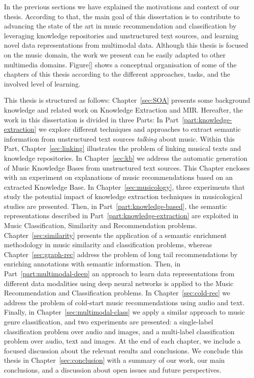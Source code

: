 In the previous sections we have explained the motivations and context of our thesis. According to that, the main goal of this dissertation is to contribute to advancing the state of the art in music recommendation and classification by leveraging knowledge repositories and unstructured text sources, and learning novel data representations from multimodal data. Although this thesis is focused on the music domain, the work we present can be easily adapted to other multimedia domains. Figure\ref{} shows a conceptual organisation of some of the chapters of this thesis according to the different approaches, tasks, and the involved level of learning.

This thesis is structured as follows: Chapter~\ref{sec:SOA} presents some background knowledge and related work on Knowledge Extraction and MIR. Hereafter, the work in this dissertation is divided in three Parts: In Part~\ref{part:knowledge-extraction} we explore different techniques and approaches to extract semantic information from unstructured text sources \textit{talking} about music. Within this Part, Chapter~\ref{sec:linking} illustrates the problem of linking musical texts and knowledge repositories. In Chapter~\ref{sec:kb} we address the automatic generation of Music Knowledge Bases from unstructured text sources. This Chapter encloses with an experiment on explanations of music recommendations based on an extracted Knowledge Base. In Chapter~\ref{sec:musicology}, three experiments that study the potential impact of knowledge extraction techniques in musicological studies are presented.
Then, in Part~\ref{part:knowledge-based}, the semantic representations described in Part~\ref{part:knowledge-extraction} are exploited in Music Classification, Similarity and Recommendation problems. Chapter~\ref{sec:similarity} presents the application of a semantic enrichment methodology in music similarity and classification problems, whereas Chapter~\ref{sec:graph-rec} address the problem of long tail recommendations by enriching annotations with semantic information.
Then, in Part~\ref{part:multimodal-deep} an approach to learn data representations from different data modalities using deep neural networks is applied to the Music Recommendation and Classification problems. In Chapter~\ref{sec:cold-rec} we address the problem of cold-start music recommendations using audio and text. Finally, in Chapter~\ref{sec:multimodal-class} we apply a similar approach to music genre classification, and two experiments are presented: a single-label classification problem over audio and images, and a multi-label classification problem over audio, text and images.
At the end of each chapter, we include a focused discussion about the relevant results and conclusions. We conclude this thesis in Chapter~\ref{sec:conclusion} with a summary of our work, our main conclusions, and a discussion about open issues and future perspectives.




